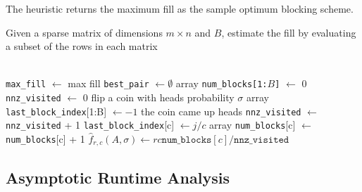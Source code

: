 The heuristic returns the maximum fill as the sample optimum blocking scheme.

 \begin{samepage}
    \begin{alg}
      Given a sparse matrix of dimensions $m \times n$ and $B$, estimate the fill by evaluating a subset of the rows in each matrix
      \begin{algorithmic}[1]
         \\
       \State \texttt{max\_fill} $\gets$ max fill
       \State \texttt{best\_pair} $\gets \emptyset$
          \State array \texttt{num\_blocks[1:$B$]} $\gets$ 0
          \State \texttt{nnz\_visited} $\gets$ 0
          \State flip a coin with heads probability $\sigma$
          \State array \texttt{last\_block\_index}[1:B] $\gets -1$
          \If the coin came up heads
          \State \texttt{nnz\_visited} $\gets$ \texttt{nnz\_visited} + 1
          \State \texttt{last\_block\_index}[c] $\gets j/c$
          \State array \texttt{num\_blocks}[c] $\gets$ \texttt{num\_blocks}[c] + 1
          \EndFor
          \EndFor
          \State $\hat{f}_{r,c}(A, \sigma) \gets rc\texttt{num\_blocks}[c]  /  \texttt{nnz\_visited} $
          \EndIf
          \EndFor
          \EndFor
        \EndFunction
      \end{algorithmic}
      \label{alg:oski}
    \end{alg}
    \end{samepage}


\subsection{Asymptotic Runtime Analysis}
